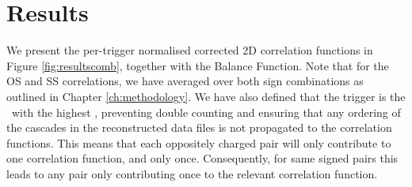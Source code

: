 



\section{Results}
\label{sec:results}
We present the per-trigger normalised corrected 2D correlation functions  in Figure \ref{fig:resultscomb}, together with the Balance Function. Note that for the OS and SS correlations, we have averaged over both sign combinations as outlined in Chapter \ref{ch:methodology}. We have also defined that the trigger is the \Xi\ with the highest \pt, preventing double counting and ensuring that any ordering of the cascades in the reconstructed data files is not propagated to the correlation functions. This means that each oppositely charged pair will only contribute to one  correlation function, and only once. Consequently, for same signed pairs this leads to any pair only contributing once to the relevant correlation function. 

